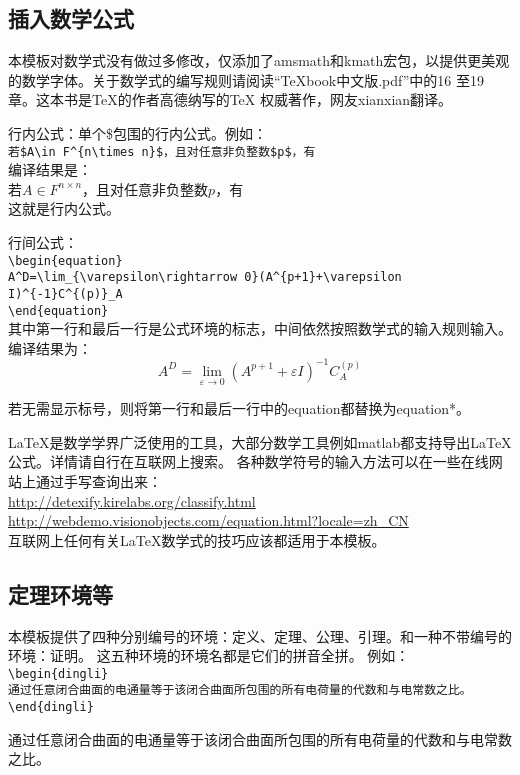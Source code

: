 \subsection{插入数学公式}
本模板对数学式没有做过多修改，仅添加了amsmath和kmath宏包，以提供更美观的数学字体。关于数学式的编写规则请阅读“TeXbook中文版.pdf”中的16 至19 章。这本书是\TeX{}的作者高德纳写的\TeX{} 权威著作，网友xianxian翻译。

行内公式：单个\$包围的行内公式。例如：\\
\verb|若$A\in F^{n\times n}$，且对任意非负整数$p$，有|\\
编译结果是：\\
若$A\in F^{n\times n}$，且对任意非负整数$p$，有\\
这就是行内公式。

行间公式：\\
\verb|\begin{equation}|\\
\verb|A^D=\lim_{\varepsilon\rightarrow 0}(A^{p+1}+\varepsilon I)^{-1}C^{(p)}_A|\\
\verb|\end{equation}|\\
其中第一行和最后一行是公式环境的标志，中间依然按照数学式的输入规则输入。\\
编译结果为：\\
\begin{equation}
A^D=\lim_{\varepsilon\rightarrow 0}(A^{p+1}+\varepsilon I)^{-1}C^{(p)}_A
\end{equation}

若无需显示标号，则将第一行和最后一行中的equation都替换为equation*。

\LaTeX 是数学学界广泛使用的工具，大部分数学工具例如matlab都支持导出LaTeX公式。详情请自行在互联网上搜索。
各种数学符号的输入方法可以在一些在线网站上通过手写查询出来：\\\url{http://detexify.kirelabs.org/classify.html}\\
\url{http://webdemo.visionobjects.com/equation.html?locale=zh_CN}\\
互联网上任何有关LaTeX数学式的技巧应该都适用于本模板。

\subsection{定理环境等}
本模板提供了四种分别编号的环境：定义、定理、公理、引理。和一种不带编号的环境：证明。
这五种环境的环境名都是它们的拼音全拼。
例如：\\
\verb|\begin{dingli}|\\
\verb|通过任意闭合曲面的电通量等于该闭合曲面所包围的所有电荷量的代数和与电常数之比。|\\
\verb|\end{dingli}|\\
\begin{dingli}
通过任意闭合曲面的电通量等于该闭合曲面所包围的所有电荷量的代数和与电常数之比。
\end{dingli}

